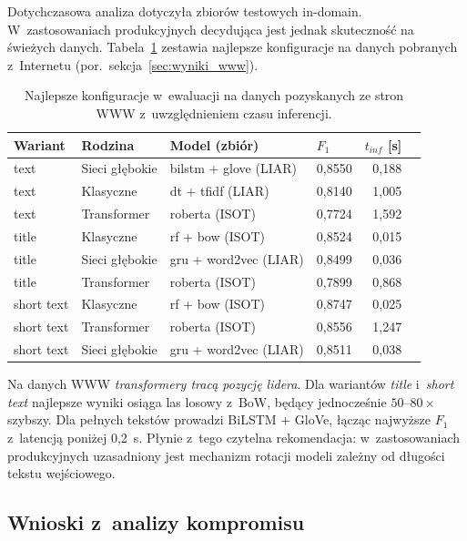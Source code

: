 \documentclass[oneside,polski,logo]{amuthesis}
\begin{document}
Dotychczasowa analiza dotyczyła zbiorów testowych in-domain.
W~zastosowaniach produkcyjnych decydująca jest jednak skuteczność
na świeżych danych. Tabela~\ref{tab:kompromis_web} zestawia najlepsze
konfiguracje na danych pobranych z~Internetu (por.\ sekcja~\ref{sec:wyniki_www}).

\begin{table}[ht]
\centering
\caption{Najlepsze konfiguracje w~ewaluacji na danych pozyskanych
ze stron WWW z~uwzględnieniem czasu inferencji.}
\label{tab:kompromis_web}
\begin{tabular}{llllrr}
\toprule
Wariant & Rodzina & Model (zbiór) & $F_1$ & $t_{inf}$ [s] \\
\midrule
text       & Sieci głębokie   & bilstm + glove (LIAR)       & 0,8550 & 0,188 \\
text       & Klasyczne   & dt + tfidf (LIAR)           & 0,8140 & 1,005 \\
text       & Transformer   & roberta (ISOT)              & 0,7724 & 1,592 \\
title      & Klasyczne   & rf + bow (ISOT)             & 0,8524 & 0,015 \\
title      & Sieci głębokie   & gru + word2vec (LIAR)       & 0,8499 & 0,036 \\
title      & Transformer   & roberta (ISOT)              & 0,7899 & 0,868 \\
short text & Klasyczne   & rf + bow (ISOT)             & 0,8747 & 0,025 \\
short text & Transformer   & roberta (ISOT)              & 0,8556 & 1,247 \\
short text & Sieci głębokie   & gru + word2vec (LIAR)       & 0,8511 & 0,038 \\
\bottomrule
\end{tabular}
\end{table}

Na danych WWW \emph{transformery tracą pozycję lidera}. Dla wariantów
\emph{title} i~\emph{short text} najlepsze wyniki osiąga las losowy
z~BoW, będący jednocześnie \(50\)--\(80\times\) szybszy. Dla pełnych
tekstów prowadzi BiLSTM + GloVe, łącząc najwyższe \(F_1\) z~latencją
poniżej 0{,}2~s. Płynie z~tego czytelna rekomendacja: w~zastosowaniach
produkcyjnych uzasadniony jest mechanizm rotacji modeli zależny od
długości tekstu wejściowego.

\subsection{Wnioski z~analizy kompromisu}
\label{sec:kompromis_wnioski}
\end{document}
